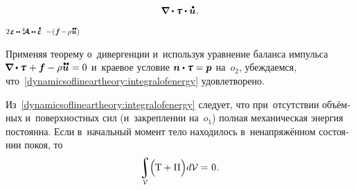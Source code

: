 \begin{otherlanguage}{russian}
\[\begin{array}{c}
\tikzmark{NablaDotTauDynamicsBegin} \boldnabla \dotp \mathboldtau \tikzmark{NablaDotTauDynamicsEnd} \dotp \mathdotabove{\bm{u}} \hspace{0.1ex}.
\end{array}\]%
%
{${\scalebox{0.75}{$ 2 \hspace{.2ex} \mathboldepsilon \hspace{-0.1ex} \dotdotp \hspace{-0.1ex} \stiffnesstensor \dotdotp \mathdotabove{\mathboldepsilon} $}}$}
%
{${\scalebox{0.75}{$ - \hspace{.2ex} (\hspace{.12ex} \bm{f} \hspace{-0.2ex} - \hspace{-0.2ex} \rho \hspace{0.1ex} \mathdotdotabove{\bm{u}} \hspace{.12ex}) $}}$}

\vspace{.66em} \noindent Применяя теорему о~дивергенции и~используя уравнение баланса импульса ${\hspace{-0.24ex}\boldnabla \dotp \mathboldtau \hspace{0.15ex} + \bm{f} - \rho \hspace{0.1ex} \mathdotdotabove{\bm{u}} \hspace{.1ex} = 0}$ и~краевое условие ${\bm{n} \dotp \mathboldtau = \bm{p}}$ на~$o_2$, убеждаемся, что~\eqref{dynamicsoflineartheory:integralofenergy} удовлетворено.

Из~\eqref{dynamicsoflineartheory:integralofenergy} следует, что при~отсутствии объёмных и~поверхностных сил (и~закреплении на~$o_1$) полная механическая энергия постоянна. Если в~начальный момент тело находилось в~ненапряжённом состоянии покоя, то
\nopagebreak\begin{equation}\label{dynamicsoflineartheory:zeroenergyatinitialmoment}
\scalebox{.96}{$\displaystyle \integral\displaylimits_{\mathcal{V}}$} \hspace{-0.5ex} \left(^{\mathstrut} \hspace{-0.24ex} \mathrm{T} + \Pi \right) \hspace{-0.4ex} d\mathcal{V} = \hspace{.12ex} 0 \hspace{.1ex}.
\vspace{-0.25em}
\end{equation}


\end{otherlanguage}
